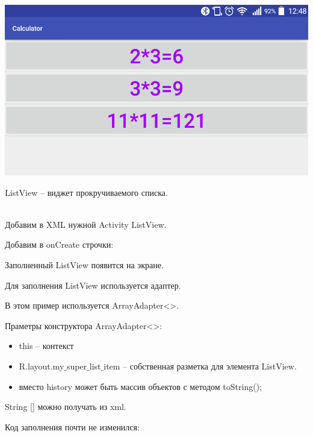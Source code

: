 
\\

    \includegraphics[scale=0.3]{07-list-views/Screenshot.png}

    ListView -- виджет прокручиваемого списка.
    

\\

    Добавим в XML нужной Activity ListView. 

    
    Добавим в onCreate строчки:
    

    Заполненный ListView появится на экране.
    
    Для заполнения ListView используется адаптер. 
    
    В этом пример используется ArrayAdapter<>.
    
    \pagebreak
    Праметры конструктора ArrayAdapter<>:
    \begin{itemize}
        \item this -- контекст
        \item R.layout.my$\_$super$\_$list$\_$item -- собственная разметка для элемента ListView.
        \item вместо history может быть массив объектов с методом toString();
    \end{itemize}

    
    String [] можно получать из xml.
    
    
    Код заполнения почти не изменился:
    
